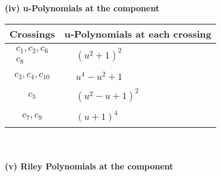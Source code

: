 \documentclass[1p]{elsarticle_modified}
\theoremstyle{definition}
\begin{document}
\newpage\renewcommand{\arraystretch}{1}
\flushleft \textbf{(iv) u-Polynomials at the component}\newline \\
\begin{tabular}{m{50pt}|m{274pt}}
Crossings & \hspace{64pt}u-Polynomials at each crossing \\
\hline $$\begin{aligned}c_{1},c_{2},c_{6}\\c_{8}\end{aligned}$$&$\begin{aligned}
&(u^2+1)^2
\end{aligned}$\\
\hline $$\begin{aligned}c_{3},c_{4},c_{10}\end{aligned}$$&$\begin{aligned}
&u^4- u^2+1
\end{aligned}$\\
\hline $$\begin{aligned}c_{5}\end{aligned}$$&$\begin{aligned}
&(u^2- u+1)^2
\end{aligned}$\\
\hline $$\begin{aligned}c_{7},c_{9}\end{aligned}$$&$\begin{aligned}
&(u+1)^4
\end{aligned}$\\
\hline
\end{tabular}\\~\\
\newpage\renewcommand{\arraystretch}{1}
\flushleft \textbf{(v) Riley Polynomials at the component}\newline \\
\end{document}
